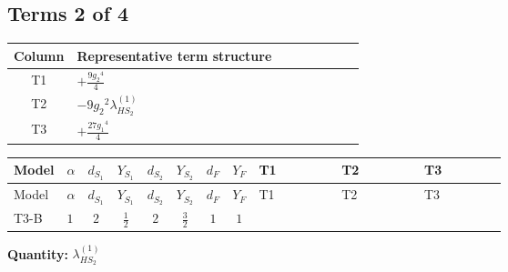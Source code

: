 \documentclass[8pt]{article}
\begin{document}
\begin{landscape}
\subsection*{Terms 2 of 4}
\begin{center}
\begin{tabular}{@{}c >{\raggedright\arraybackslash}p{0.82\linewidth}@{}}
\toprule
Column & Representative term structure \\
\midrule
T1 & \(\displaystyle +\frac{9 {g_2}^4}{4}\) \\
\midrule
T2 & \(\displaystyle -9 {g_2}^2 {\lambda_{HS_2}^{(1)}}\) \\
\midrule
T3 & \(\displaystyle +\frac{27 {g_1}^4}{4}\) \\
\midrule
\bottomrule
\end{tabular}
\end{center}
\smallskip
\tiny
\begin{longtable}{@{}llcccccc >{\raggedright\arraybackslash}p{0.21\linewidth} >{\raggedright\arraybackslash}p{0.21\linewidth} >{\raggedright\arraybackslash}p{0.21\linewidth}@{}}
\toprule
Model & $\alpha$ & $d_{S_1}$ & $Y_{S_1}$ & $d_{S_2}$ & $Y_{S_2}$ & $d_F$ & $Y_F$ & T1 & T2 & T3 \\
\midrule
\endfirsthead
\toprule
Model & $\alpha$ & $d_{S_1}$ & $Y_{S_1}$ & $d_{S_2}$ & $Y_{S_2}$ & $d_F$ & $Y_F$ & T1 & T2 & T3 \\
\midrule
\endhead
T3-B & $1$ & $2$ & $\frac{1}{2}$ & $2$ & $\frac{3}{2}$ & $1$ & $1$ & \scriptsize\adjustbox{max width=\linewidth}{$\begin{gathered} +\frac{9 {g_2}^4}{4}\end{gathered}$} & \scriptsize\adjustbox{max width=\linewidth}{$\begin{gathered} -9 {g_2}^2 {\lambda_{HS_2}^{(1)}}\end{gathered}$} & \scriptsize\adjustbox{max width=\linewidth}{$\begin{gathered} +\frac{27 {g_1}^4}{4}\end{gathered}$} \\
\midrule
\bottomrule
\end{longtable}
\clearpage
\noindent\textbf{Quantity: }$\lambda_{HS_2}^{(1)}$\par\smallskip

\end{landscape}
\end{document}
